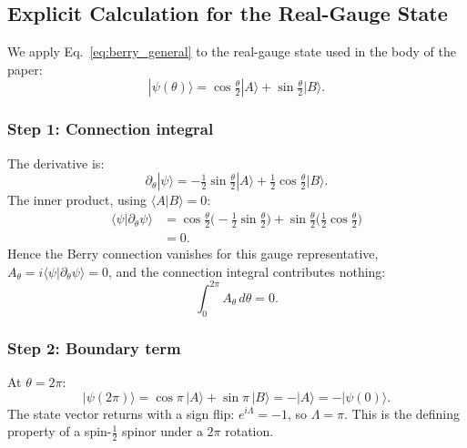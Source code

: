 \documentclass[%
 reprint,
 amsmath,amssymb,
 aps,
 prb,
]{revtex4-2}
\numberwithin{equation}{section}
\theoremstyle{definition}
\theoremstyle{remark}
\begin{document}
\subsection{Explicit Calculation for the Real-Gauge State}

We apply Eq.~\eqref{eq:berry_general} to the real-gauge state used in the body of the paper:
\begin{equation}
|\psi(\theta)\rangle
= \cos\tfrac{\theta}{2}|A\rangle + \sin\tfrac{\theta}{2}|B\rangle.
\label{eq:state_real_app}
\end{equation}

\subsubsection{Step 1: Connection integral}

The derivative is:
\begin{equation}
\partial_\theta|\psi\rangle
= -\tfrac{1}{2}\sin\tfrac{\theta}{2}|A\rangle
  + \tfrac{1}{2}\cos\tfrac{\theta}{2}|B\rangle.
\end{equation}
The inner product, using $\langle A|B\rangle = 0$:
\begin{align}
\langle\psi|\partial_\theta\psi\rangle
&= \cos\tfrac{\theta}{2}\bigl(-\tfrac{1}{2}\sin\tfrac{\theta}{2}\bigr)
   + \sin\tfrac{\theta}{2}\bigl(\tfrac{1}{2}\cos\tfrac{\theta}{2}\bigr)
\nonumber\\
&= 0.
\label{eq:A_real_zero}
\end{align}
Hence the Berry connection vanishes for this gauge representative, $A_\theta = i\langle\psi|\partial_\theta\psi\rangle = 0$, and the connection integral contributes nothing:
\begin{equation}
\int_0^{2\pi} A_\theta\,d\theta = 0.
\label{eq:conn_int_zero}
\end{equation}

\subsubsection{Step 2: Boundary term}

At $\theta = 2\pi$:
\begin{equation}
|\psi(2\pi)\rangle
= \cos\pi\,|A\rangle + \sin\pi\,|B\rangle
= -|A\rangle
= -|\psi(0)\rangle.
\label{eq:psi_2pi}
\end{equation}
The state vector returns with a sign flip: $e^{i\Lambda} = -1$, so $\Lambda = \pi$.  This is the defining property of a spin-$\tfrac{1}{2}$ spinor under a $2\pi$ rotation.
\end{document}
